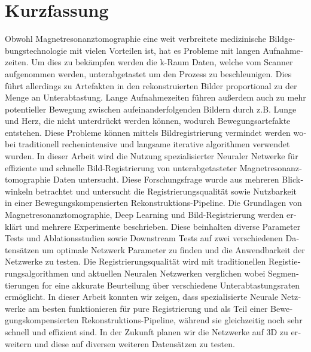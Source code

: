 \chapter*{Kurzfassung}
\begin{otherlanguage}{ngerman}
Obwohl Magnetresonanztomographie eine weit verbreitete medizinische Bildgebungstechnologie mit vielen Vorteilen ist, hat es Probleme mit langen Aufnahmezeiten. Um dies zu bekämpfen werden die k-Raum Daten, welche vom Scanner aufgenommen werden, unterabgetastet um den Prozess zu beschleunigen. Dies führt allerdings zu Artefakten in den rekonstruierten Bilder proportional zu der Menge an Unterabtastung. Lange Aufnahmezeiten führen außerdem auch zu mehr potentieller Bewegung zwischen aufeinanderfolgenden Bildern durch z.B. Lunge und Herz, die nicht unterdrückt werden können, wodurch Bewegungsartefakte entstehen. Diese Probleme können mittels Bildregistrierung vermindet werden wobei traditionell rechenintensive und langsame iterative algorithmen verwendet wurden. In dieser Arbeit wird die Nutzung spezialisierter Neuraler Netwerke für effiziente und schnelle Bild-Registrierung von unterabgetasteter Magnetresonanztomographie Daten untersucht. Diese Forschungsfrage wurde aus mehreren Blickwinkeln betrachtet und untersucht die Registrierungsqualität sowie Nutzbarkeit in einer Bewegungskompensierten Rekonstruktions-Pipeline. Die Grundlagen von Magnetresonanztomographie, Deep Learning und Bild-Registrierung werden erklärt und mehrere Experimente beschrieben. Diese beinhalten diverse Parameter Tests und Ablationsstudien sowie Downstream Tests auf zwei verschiedenen Datensätzen um optimale Netzwerk Parameter zu finden und die Anwendbarkeit der Netzwerke zu testen. Die Registrierungsqualität wird mit traditionellen Registierungsalgorithmen und aktuellen Neuralen Netzwerken verglichen  wobei Segmentierungen for eine akkurate Beurteilung über verschiedene Unterabtastungsraten ermöglicht. In dieser Arbeit konnten wir zeigen, dass spezialisierte Neurale Netzwerke am besten funktionieren für pure Registrierung und als Teil einer Bewegungskompensierten Rekonstruktions-Pipeline, während sie gleichzeitig noch sehr schnell und effizient sind. In der Zukunft planen wir die Netzwerke auf 3D zu erweitern und diese auf diversen weiteren Datensätzen zu testen.
\end{otherlanguage}